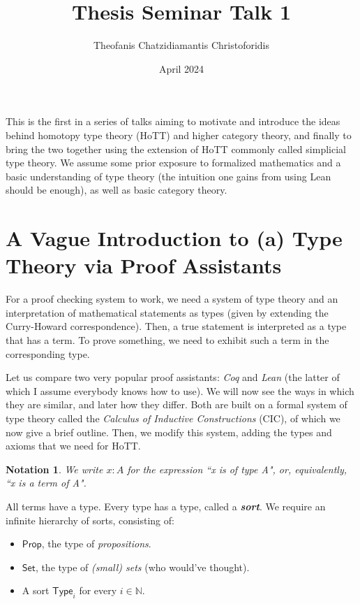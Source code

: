 \documentclass{scrartcl}
\title{Thesis Seminar Talk 1}
\author{Theofanis Chatzidiamantis Christoforidis}
\date{April 2024}
\newcommand{\textbi}[1]{\textbf{\textit{#1}}}
\newcommand{\bN}{\mathbb{N}}
\newcommand{\tProp}{\mathsf{Prop}}
\newcommand{\tSet}{\mathsf{Set}}
\newcommand{\tType}{\mathsf{Type}}
\newtheorem{nota}[subsection]{Notation}
\newcommand{\tcnote}[1]{\todo[color=orange!40,linecolor=green!40!black,size=\tiny]{#1}}
\begin{document}
\maketitle


This is the first in a series of talks aiming to motivate and introduce the ideas behind homotopy type theory (HoTT) and higher category theory, and finally to bring the two together using the extension of HoTT commonly called simplicial type theory. We assume some prior exposure to formalized mathematics and a basic understanding of type theory (the intuition one gains from using Lean should be enough), as well as basic category theory.

\section{A Vague Introduction to (a) Type Theory via Proof Assistants}

For a proof checking system to work, we need a system of type theory and an interpretation of mathematical statements as types (given by extending the Curry-Howard correspondence). Then, a true statement is interpreted as a type that has a term. To prove something, we need to exhibit such a term in the corresponding type. 
\par Let us compare two very popular proof assistants: \textit{Coq} and \textit{Lean} (the latter of which I assume everybody knows how to use). We will now see the ways in which they are similar, and later how they differ. Both are built on a formal system of type theory called the \textit{Calculus of Inductive Constructions} (CIC), of which we now give a brief outline. Then, we modify this system, adding the types and axioms that we need for HoTT.

\begin{nota}
    We write $x:A$ for the expression ``x is of type A", or, equivalently, ``x is a term of A".
\end{nota}
All terms have a type. Every type has a type, called a \textbi{sort}. We require an infinite hierarchy of sorts, consisting of:
\begin{itemize}
    \item $\tProp$, the type of \textit{propositions}. \tcnote{This is not assumed in HoTT}
    \item $\tSet$, the type of \textit{(small) sets} (who would've thought).
    \item A sort $\tType_i$ for every $i\in\bN$. 
\end{itemize}
\end{document}
